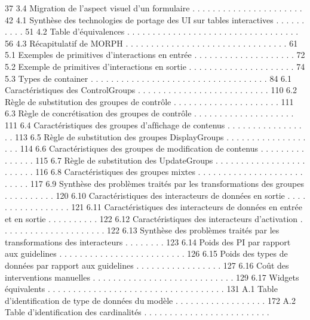 \documentclass{article}
\begin{document}
37
3.4
Migration de l’aspect visuel d’un formulaire . . . . . . . . . . . . . . . . . . . . . .
42
4.1
Synth\`{e}se des technologies de portage des UI sur tables interactives . . . . . . . . . .
51
4.2
Table d’\'{e}quivalences
. . . . . . . . . . . . . . . . . . . . . . . . . . . . . . . . . .
56
4.3
R\'{e}capitulatif de MORPH . . . . . . . . . . . . . . . . . . . . . . . . . . . . . . . .
61
5.1
Exemples de primitives d’interactions en entr\'{e}e . . . . . . . . . . . . . . . . . . . .
72
5.2
Exemple de primitives d’interactions en sortie . . . . . . . . . . . . . . . . . . . . .
74
5.3
Types de container
. . . . . . . . . . . . . . . . . . . . . . . . . . . . . . . . . . .
84
6.1
Caract\'{e}ristiques des ControlGroups
. . . . . . . . . . . . . . . . . . . . . . . . . .
110
6.2
R\`{e}gle de substitution des groupes de contr\^{o}le
. . . . . . . . . . . . . . . . . . . . .
111
6.3
R\`{e}gle de concr\'{e}tisation des groupes de contr\^{o}le . . . . . . . . . . . . . . . . . . . .
111
6.4
Caract\'{e}ristiques des groupes d’afﬁchage de contenus
. . . . . . . . . . . . . . . . .
113
6.5
R\`{e}gle de substitution des groupes DisplayGroups . . . . . . . . . . . . . . . . . . .
114
6.6
Caract\'{e}ristiques des groupes de modiﬁcation de contenus . . . . . . . . . . . . . . .
115
6.7
R\`{e}gle de substitution des UpdateGroups . . . . . . . . . . . . . . . . . . . . . . . .
116
6.8
Caract\'{e}ristiques des groupes mixtes
. . . . . . . . . . . . . . . . . . . . . . . . . .
117
6.9
Synth\`{e}se des probl\`{e}mes trait\'{e}s par les transformations des groupes . . . . . . . . . .
120
6.10 Caract\'{e}ristiques des interacteurs de donn\'{e}es en sortie . . . . . . . . . . . . . . . . .
121
6.11 Caract\'{e}ristiques des interacteurs de donn\'{e}es en entr\'{e}e et en sortie
. . . . . . . . . .
122
6.12 Caract\'{e}ristiques des interacteurs d’activation
. . . . . . . . . . . . . . . . . . . . .
122
6.13 Synth\`{e}se des probl\`{e}mes trait\'{e}s par les transformations des interacteurs . . . . . . . .
123
6.14 Poids des PI par rapport aux guidelines . . . . . . . . . . . . . . . . . . . . . . . . .
126
6.15 Poids des types de donn\'{e}es par rapport aux guidelines . . . . . . . . . . . . . . . . .
127
6.16 Co\^{u}t des interventions manuelles . . . . . . . . . . . . . . . . . . . . . . . . . . . .
129
6.17 Widgets \'{e}quivalents . . . . . . . . . . . . . . . . . . . . . . . . . . . . . . . . . . .
131
A.1
Table d’identiﬁcation de type de donn\'{e}es du mod\`{e}le . . . . . . . . . . . . . . . . . .
172
A.2
Table d’identiﬁcation des cardinalit\'{e}s
. . . . . . . . . . . . . . . . . . . . . . . . .
\end{document}
